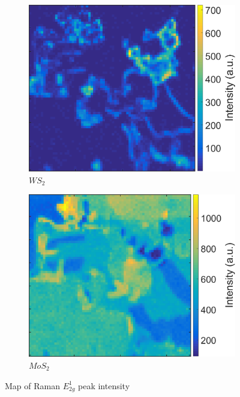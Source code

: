 \begin{figure}[h]
	\begin{center}
		\begin{subfigure}[b]{0.45\textwidth}
			\includegraphics[width=\textwidth]{Heterostructures/RamanIntensityMapEWS2.png}
			\caption{$WS_2$}
			\label{fig:HeterostructuresRamanIntensityEWS2}
		\end{subfigure}
		\begin{subfigure}[b]{0.45\textwidth}
			\includegraphics[width=\textwidth]{Heterostructures/RamanIntensityMapEMoS2.png}
			\caption{$MoS_2$}
			\label{fig:HeterostructuresRamanIntensityEMoS2}
		\end{subfigure}
		\caption{Map of Raman $E^1_{2g}$ peak intensity}
		\label{fig:HeterostructuresRamanIntensityE}
	\end{center}
\end{figure}

